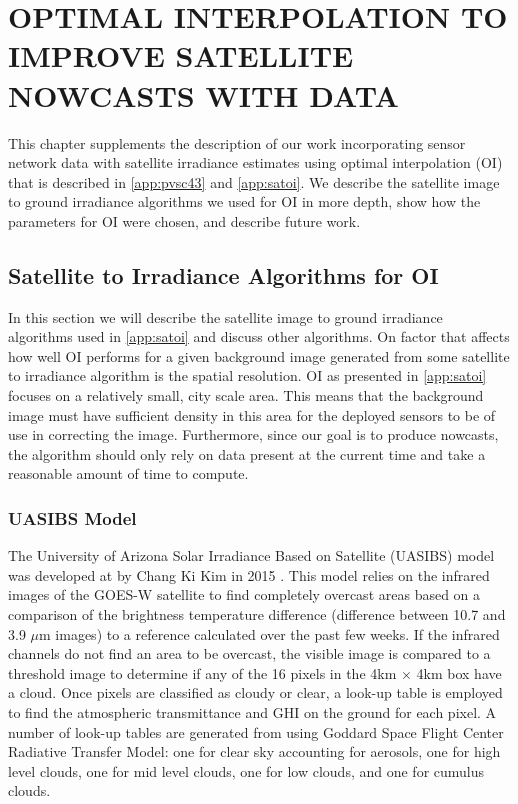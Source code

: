 \chapter{OPTIMAL INTERPOLATION TO IMPROVE SATELLITE NOWCASTS WITH DATA}
\label{chap:satoi}

This chapter supplements the description of our work incorporating
sensor network data with satellite irradiance estimates using optimal
interpolation (OI) that is described in \cref{app:pvsc43} and
\cref{app:satoi}.
We describe the satellite image to ground irradiance algorithms we
used for OI in more depth, show how the parameters for OI were chosen,
and describe future work.

\section{Satellite to Irradiance Algorithms for OI}
In this section we will describe the satellite image to ground
irradiance algorithms used in \cref{app:satoi} and discuss other
algorithms.
On factor that affects how well OI performs for a given background
image generated from some satellite to irradiance algorithm is the
spatial resolution.
OI as presented in \cref{app:satoi} focuses on a relatively small,
city scale area.
This means that the background image must have sufficient density in
this area for the deployed sensors to be of use in correcting the
image.
Furthermore, since our goal is to produce nowcasts, the algorithm
should only rely on data present at the current time and take a
reasonable amount of time to compute.

\subsection{UASIBS Model}
The University of Arizona Solar Irradiance Based on Satellite (UASIBS)
model was developed at by Chang Ki Kim in 2015 \citep{Kim2016}.
This model relies on the infrared images of the GOES-W satellite to
find completely overcast areas based on a comparison of the brightness
temperature difference (difference between 10.7 and 3.9 $\mu$m
images) to a reference calculated over the past few weeks.
If the infrared channels do not find an area to be overcast, the
visible image is compared to a threshold image to determine if any of
the 16 pixels in the 4km $\times$ 4km box have a cloud.
Once pixels are classified as cloudy or clear, a look-up table is
employed to find the atmospheric transmittance and GHI on the ground
for each pixel.
A number of look-up tables are generated from using Goddard Space
Flight Center Radiative Transfer Model: one for clear sky
accounting for aerosols, one for high level clouds, one for mid level
clouds, one for low clouds, and one for cumulus clouds.

